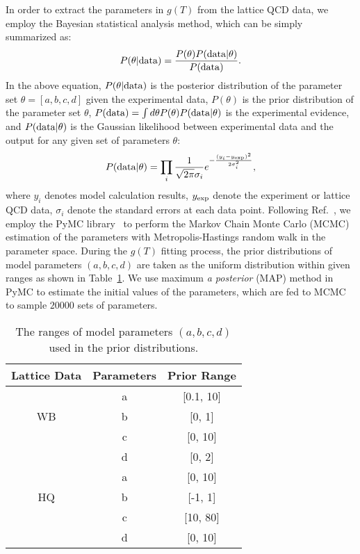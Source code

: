 \documentclass[aps,superscriptaddress,prc,twocolumn,nofootinbib]{revtex4}
\begin{document}
In order to extract the parameters in $g(T)$ from the lattice QCD data, we employ the Bayesian statistical analysis method, which can be simply summarized as:
\begin{align}
P(\theta | {\rm data}) = \frac{P(\theta) P({\rm data} | \theta)}{P({\rm data})}.
\end{align}
In the above equation, $P(\theta | {\rm data})$ is the posterior distribution of the parameter set $\theta =[a,b,c,d]$ given the experimental data, $P(\theta)$ is the prior distribution of the parameter set $\theta$, $P({\rm data}) = \int d\theta P(\theta) P({\rm data}|\theta)$ is the experimental evidence, and $P({\rm data} | \theta)$ is the Gaussian likelihood between experimental data and the output for any given set of parameters $\theta$:
\begin{align}
P({\rm data} | \theta) = \prod_i \frac{1}{\sqrt{2 \pi} \sigma_i} e^{- \frac{(y_i - y_\mathrm{exp})^2}{2 \sigma_i^2}},
\end{align}
where $y_i$ denotes model calculation results, $y_{\rm exp}$ denote the experiment or lattice QCD data, $\sigma_i$ denote the standard errors at each data point.
Following Ref.~\cite{He:2018gks}, we employ the PyMC library~\cite{pymc_bib} to perform the Markov Chain Monte Carlo (MCMC) estimation of the parameters with Metropolis-Hastings random walk in the parameter space.
During the $g(T)$ fitting process, the prior distributions of model parameters $(a,b,c,d)$ are taken as the uniform distribution within given ranges as shown in Table~\ref{tab:1}. 
We use maximum {\it a posterior} (MAP) method in PyMC to estimate the initial values of the parameters, which are fed to MCMC to sample $20000$ sets of parameters.

\begin{table}[htb]
\centering
\vspace{-5pt}
\begin{tabular}{c|c|c}
 \hline
 Lattice Data & Parameters & Prior Range  \\
 \hline
    & a & [0.1, 10]    \\
  WB   & b & [0, 1]  \\
      & c & [0, 10]   \\
      & d & [0, 2]   \\ \hline
   & a & [0, 10]   \\
  HQ   & b & [-1, 1]  \\
  	  & c & [10, 80]  \\
  	  & d & [0, 10]   \\
  \hline
\end{tabular}
	\caption{The ranges of model parameters $(a,b,c,d)$ used in the prior distributions.}
\label{tab:1}
\end{table}
\end{document}
